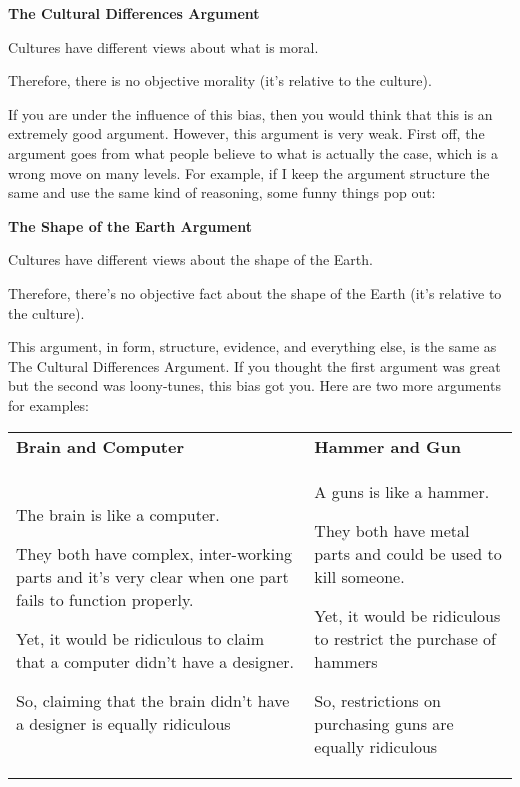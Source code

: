 \textbf{The Cultural Differences Argument}
\begin{earg}
    \item[]Cultures have different views about what is moral.
    \item[]Therefore, there is no objective morality (it's relative to the culture).
\end{earg}

If you are under the influence of this bias, then you would think that this is an extremely good argument. However, this argument is very weak. First off, the argument goes from what people believe to what is actually the case, which is a wrong move on many levels. For example, if I keep the argument structure the same and use the same kind of reasoning, some funny things pop out:

\textbf{The Shape of the Earth Argument}
\begin{earg}
    \item[]Cultures have different views about the shape of the Earth.
    \item[]Therefore, there's no objective fact about the shape of the Earth (it's relative to the culture).
\end{earg}

This argument, in form, structure, evidence, and everything else, is the same as The Cultural Differences Argument. If you thought the first argument was great but the second was loony-tunes, this bias got you.   Here are two more arguments for examples:

\begin{tabular}{p{1.5in}|p{1.5in}}
\textbf{Brain and Computer} &\textbf{Hammer and Gun}\\
\begin{earg}
    \item[]The brain is like a computer.
    \item[]They both have complex, inter-working parts and it’s very clear when one part fails to function properly.
    \item[]Yet, it would be ridiculous to claim that a computer didn’t have a designer.
    \item[]So, claiming that the brain didn’t have a designer is equally ridiculous
\end{earg}&
\begin{earg}
    \item[]A guns is like a hammer.
    \item[]They both have metal parts and could be used to kill someone.
    \item[]Yet, it would be ridiculous to restrict the purchase of hammers
    \item[]So, restrictions on purchasing guns are equally ridiculous
\end{earg}\\
\end{tabular}

